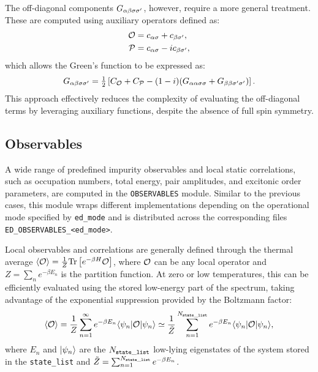 \documentclass[edipack_sp.tex]{subfiles}
\begin{document}
The off-diagonal components $G_{\alpha\beta\sigma\sigma'}$, however, 
require a more general treatment. These are computed using 
auxiliary operators defined as:
\begin{align*}
{\cal O} &= c_{\alpha\sigma} + c_{\beta\sigma'}, \\
{\cal P} &= c_{\alpha\sigma} - i c_{\beta\sigma'},
\end{align*}
which allows the Green's function to be expressed as:
\begin{equation}
G_{\alpha\beta\sigma\sigma'} = \tfrac{1}{2} \left[ C_{\cal O} + C_{\cal P} - 
(1-i)(G_{\alpha\alpha\sigma\sigma} + G_{\beta\beta\sigma'\sigma'}) \right].
\end{equation}
This approach effectively reduces the complexity of 
evaluating the off-diagonal terms by leveraging auxiliary 
functions, despite the absence of full spin symmetry.





\subsection{Observables}\label{sSecObc}
A wide range of predefined impurity observables and local 
static correlations, such as occupation numbers, total 
energy, pair amplitudes, and excitonic order parameters, 
are computed in the \texttt{OBSERVABLES} module. Similar to the
previous cases, this module wraps different implementations 
depending on the operational mode specified by 
{\tt ed\_mode} and is distributed across the corresponding 
files {\tt ED\_OBSERVABLES\_<ed\_mode>}. 



Local observables and correlations are generally defined 
through the thermal average 
$\langle {\cal O}\rangle = \tfrac{1}{Z}{\rm Tr}\left[e^{-\beta H}{\cal O}\right]$, 
where ${\cal O}$ can be any local operator and  $Z = \sum_n e^{-\beta E_n}$ is the partition function. 
At zero or low temperatures, this can be efficiently 
evaluated using the stored low-energy part of the spectrum, 
taking advantage of the exponential suppression provided by 
the Boltzmann factor:
\begin{equation}
\langle {\cal O}\rangle = \frac{1}{Z}\sum_{n=1}^{\infty} e^{-\beta E_n}
\langle \psi_n| {\cal O} |\psi_n\rangle\simeq \frac{1}{\tilde{Z}}\sum_{n=1}^{N_{\tt state\_list}} e^{-\beta E_n}
\langle \psi_n| {\cal O} |\psi_n\rangle,
\label{eq:thermal_average}
\end{equation}
where $E_n$ and $|\psi_n\rangle$ are the $N_{\tt state\_list}$ low-lying eigenstates 
of the system stored in the {\tt state\_list} and $\tilde{Z}=\sum_{n=1}^{N_{\tt state\_list}}e^{-\beta E_n}$. 
\end{document}
